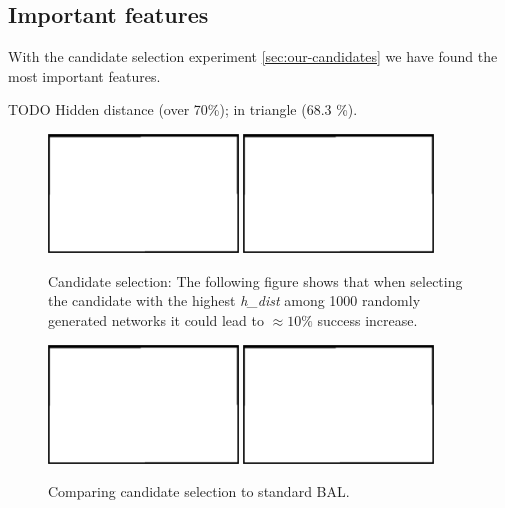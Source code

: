 
\subsection{Important features}
\label{sec:results-candidates} 

With the candidate selection experiment \ref{sec:our-candidates} we have found the most important features. 

TODO Hidden distance (over 70\%); in triangle (68.3 \%). \\


\begin{figure}[H]
  \centering
  \includegraphics[width=0.45\textwidth]{img/placeholder.png}   
  \includegraphics[width=0.45\textwidth]{img/placeholder.png}    
  \caption{Candidate selection: The following figure shows that when selecting the candidate with the highest \emph{h\_dist} among 1000 randomly generated networks it could lead to $\approx 10\%$ success increase.}
  \label{fig:results-candidates-tlr}
\end{figure}


\begin{figure}[H]
  \centering
  \includegraphics[width=0.45\textwidth]{img/placeholder.png}   
  \includegraphics[width=0.45\textwidth]{img/placeholder.png}    
  \caption{Comparing candidate selection to standard BAL.}
  \label{fig:results-candidates-epoch}
\end{figure}

